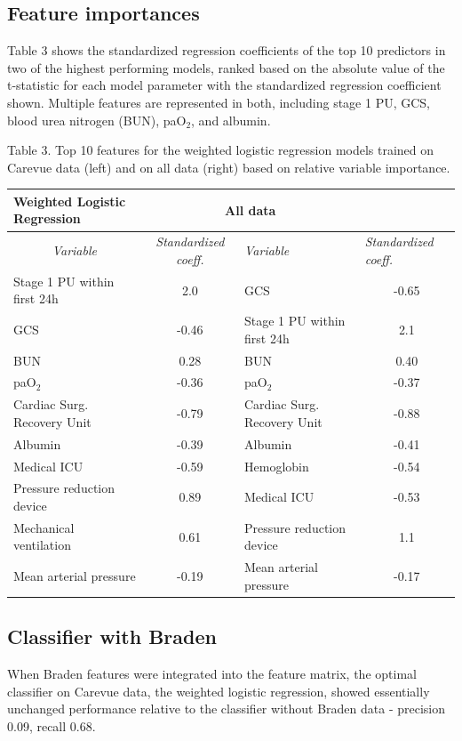 \documentclass{ws-procs11x85}
\begin{document}
\subsection{Feature importances}
Table 3 shows the standardized regression coefficients of the top 10 predictors in two of the highest performing models, ranked based on the absolute value of the t-statistic for each model parameter with the standardized regression coefficient shown. Multiple features are represented in both, including stage 1 PU, GCS, blood urea nitrogen (BUN), paO$_2$, and albumin. \\

\begin{table}[H]
\label{tab-featimp}
\centering
\footnotesize{ Table 3.  Top 10 features for the weighted logistic regression models trained on Carevue data (left) and on all data (right) based on relative variable importance.} 
\vspace{4mm}
\\
\begin{tabular}{@{}lclc@{}}
\toprule
Weighted Logistic Regression
\multicolumn{2}{c}{Carevue} & \multicolumn{2}{c}{All data} \\ \midrule
\multicolumn{1}{c}{\textit{Variable}} & \textit{Standardized coeff.} & \textit{Variable} & \multicolumn{1}{l}{\textit{Standardized coeff.}} \\
Stage 1 PU within first 24h & 2.0 & GCS & -0.65 \\ GCS & -0.46 & Stage 1 PU within first 24h & 2.1 \\
BUN & 0.28 & BUN & 0.40 \\ paO$_2$ & -0.36 & paO$_2$ & -0.37\\
Cardiac Surg. Recovery Unit & -0.79 & Cardiac Surg. Recovery Unit & -0.88 \\ Albumin & -0.39 & Albumin & -0.41 \\
Medical ICU & -0.59 & Hemoglobin & -0.54 \\ Pressure reduction device & 0.89 & Medical ICU & -0.53 \\
Mechanical ventilation & 0.61 & Pressure reduction device & 1.1 \\ Mean arterial pressure & -0.19 & Mean arterial pressure &  -0.17 \\
\bottomrule
\end{tabular}
\end{table}

\subsection{Classifier with Braden}
When Braden features were integrated into the feature matrix, the optimal classifier on Carevue data, the weighted logistic regression,  showed essentially unchanged performance relative to the classifier without Braden data - precision 0.09, recall 0.68.
\end{document}
